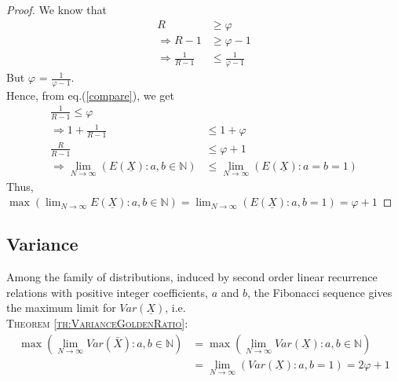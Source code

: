 \begin{multicols}{2}
\begin{proof}\renewcommand{\qedsymbol}{} 
 We know that 
\begin{align}
 R &\geq \varphi\nonumber\\
 \Rightarrow R-1 &\geq \varphi -1 \nonumber\\
\Rightarrow \frac{1}{R-1} &\leq \frac{1}{\varphi-1}\label{eq-10.1}
 \end{align}
 But $\varphi$ = $\displaystyle{\frac{1}{\varphi-1}}$. \\Hence, from eq.(\ref{compare}), we get
{\fontsize{8}{9}\selectfont\begin{align}
\frac{1}{R-1} \leq \varphi\nonumber\\
\Rightarrow 1 + \frac{1}{R-1} &\leq 1+\varphi\label{eq-10.2}\\
\displaystyle{\frac{R}{R-1}} &\leq \varphi + 1 \nonumber\\
\Rightarrow \lim_{N\rightarrow \infty}\left(E(\underline{X}):a,b\in \mathbb N\right) &\leq \lim_{N\rightarrow \infty}\left(E(\underline{X}): a = b = 1\right)\label{eq-10.3}
\end{align}}
Thus, \\
$\max{\left(\displaystyle{\lim_{N\rightarrow \infty}} E(\underline{X}): a, b \in \mathbb N\right)} = \displaystyle{\lim_{N \rightarrow \infty}}\left(E(\underline{X}) : a,b = 1\right) = \varphi + 1$
\end{proof}

\subsection{Variance}\label{subsection-10.2}

Among the family of distributions, induced by second order linear recurrence relations with positive integer coefficients, $a$ and $b$, the Fibonacci sequence gives the maximum limit for $Var(\underline{X})$, i.e.\\
\textsc{Theorem {\ref{th:VarianceGoldenRatio}}:}
{\fontsize{7}{8}\selectfont\begin{align}
\max{\left(\lim_{N\rightarrow \infty}Var(\bar{X}): a,b \in \mathbb N\right)}&= \max{\left(\lim_{N\rightarrow \infty}Var(\underline{X}): a,b \in \mathbb N\right)}\label{eq-10.4}\\
 &= \lim_{N \rightarrow \infty}\left(Var(\underline{X}):a,b=1\right) = 2\varphi + 1\label{eq-10.5}
\end{align}}

\vspace{-.7cm}


\end{multicols}
